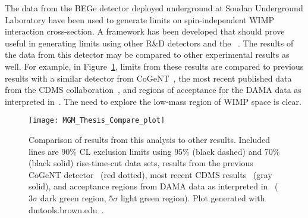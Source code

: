 The data from the BEGe detector deployed underground at Soudan Underground Laboratory have been used to generate limits on spin-independent WIMP interaction cross-section.  A framework has been developed that should prove useful in generating limits using other R\&D detectors and the \MJ~\minmod.  The results of the data from this detector may be compared to other experimental results as well.  For example, in Figure~\ref{fig:BeGeLimitsComparedToOtherDataSets}, limits from these results are compared to previous results with a similar detector from CoGeNT~\cite{Aalseth:2008aa}, the most recent published data from the CDMS collaboration~\cite{Ahmed:2009zw}, and regions of acceptance for the DAMA data as interpreted in~\cite{Savage:2008er}.  The need to explore the low-mass region of WIMP space is clear.  




		\begin{figure}
			\centering
			\texttt{[image: MGM\_Thesis\_Compare\_plot]}
			\caption[Comparison of exclusions to CDMS, DAMA, and previous CoGeNT results.]
			{Comparison of results from this analysis to other results.  Included lines are 90\% CL 
			exclusion limits using 95\% (black dashed) and 70\% (black solid) rise-time-cut data sets, 
			results from the previous CoGeNT detector~\cite{Aalseth:2008aa} (red dotted), 
			most recent CDMS results~\cite{Ahmed:2009zw} (gray solid), and acceptance regions
			from DAMA data as interpreted in~\cite{Savage:2008er} ($3\sigma$ dark green region,
			$5\sigma$ light green region).  Plot generated with dmtools.brown.edu~\cite{Gai03}.}
			\label{fig:BeGeLimitsComparedToOtherDataSets}
		\end{figure}		







